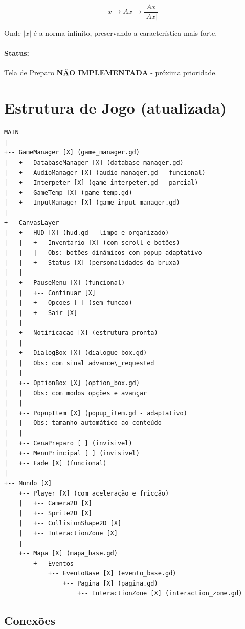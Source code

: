 \documentclass[12pt]{article}
\begin{document}
\[
x \rightarrow Ax \rightarrow \frac{Ax}{|Ax|}
\]

Onde \(|x|\) é a norma infinito, preservando a característica mais forte.

\paragraph{Status:} Tela de Preparo \textbf{NÃO IMPLEMENTADA} - próxima prioridade.

\newpage

\section{Estrutura de Jogo (atualizada)}

\begin{verbatim}
MAIN
|
+-- GameManager [X] (game_manager.gd)
|   +-- DatabaseManager [X] (database_manager.gd)
|   +-- AudioManager [X] (audio_manager.gd - funcional)
|   +-- Interpeter [X] (game_interpeter.gd - parcial)
|   +-- GameTemp [X] (game_temp.gd)
|   +-- InputManager [X] (game_input_manager.gd)
|
+-- CanvasLayer
|   +-- HUD [X] (hud.gd - limpo e organizado)
|   |   +-- Inventario [X] (com scroll e botões)
|   |   |   Obs: botões dinâmicos com popup adaptativo
|   |   +-- Status [X] (personalidades da bruxa)
|   |
|   +-- PauseMenu [X] (funcional)
|   |   +-- Continuar [X]
|   |   +-- Opcoes [ ] (sem funcao)
|   |   +-- Sair [X]
|   |
|   +-- Notificacao [X] (estrutura pronta)
|   |
|   +-- DialogBox [X] (dialogue_box.gd)
|   |   Obs: com sinal advance\_requested
|   |
|   +-- OptionBox [X] (option_box.gd)
|   |   Obs: com modos opções e avançar
|   |
|   +-- PopupItem [X] (popup_item.gd - adaptativo)
|   |   Obs: tamanho automático ao conteúdo
|   |
|   +-- CenaPreparo [ ] (invisivel)
|   +-- MenuPrincipal [ ] (invisivel)
|   +-- Fade [X] (funcional)
|
+-- Mundo [X]
    +-- Player [X] (com aceleração e fricção)
    |   +-- Camera2D [X]
    |   +-- Sprite2D [X]
    |   +-- CollisionShape2D [X]
    |   +-- InteractionZone [X]
    |
    +-- Mapa [X] (mapa_base.gd)
        +-- Eventos
            +-- EventoBase [X] (evento_base.gd)
                +-- Pagina [X] (pagina.gd)
                    +-- InteractionZone [X] (interaction_zone.gd)
\end{verbatim}

\subsection{Conexões}
\end{document}
